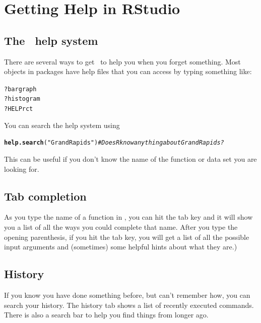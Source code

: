 \documentclass[twoside]{book}\usepackage[]{graphicx}\usepackage[]{xcolor}
\makeatletter
\newcommand{\hlstr}[1]{\textcolor[rgb]{0.192,0.494,0.8}{#1}}%
\newcommand{\hlcom}[1]{\textcolor[rgb]{0.678,0.584,0.686}{\textit{#1}}}%
\newcommand{\hlopt}[1]{\textcolor[rgb]{0,0,0}{#1}}%
\newcommand{\hlstd}[1]{\textcolor[rgb]{0.345,0.345,0.345}{#1}}%
\newcommand{\hlkwd}[1]{\textcolor[rgb]{0.737,0.353,0.396}{\textbf{#1}}}%
\newenvironment{kframe}{%
 \def\at@end@of@kframe{}%
 \ifinner\ifhmode%
  \def\at@end@of@kframe{\end{minipage}}%
  \begin{minipage}{\columnwidth}%
 \fi\fi%
 \def\FrameCommand##1{\hskip\@totalleftmargin \hskip-\fboxsep
 \colorbox{shadecolor}{##1}\hskip-\fboxsep
     \hskip-\linewidth \hskip-\@totalleftmargin \hskip\columnwidth}%
 \MakeFramed {\advance\hsize-\width
   \@totalleftmargin\z@ \linewidth\hsize
   \@setminipage}}%
 {\par\unskip\endMakeFramed%
 \at@end@of@kframe}
\newenvironment{knitrout}{}{} %
\makeatother
\begin{document}
\section{Getting Help in RStudio}

\subsection{The \RStudio\ help system}
There are several ways to get \RStudio\ to help you when you forget something.
Most objects in packages have help files that you can access by typing something 
like:
\begin{knitrout}
\color{fgcolor}\begin{kframe}
\begin{alltt}
\hlopt{?}\hlstd{bargraph}
\hlopt{?}\hlstd{histogram}
\hlopt{?}\hlstd{HELPrct}
\end{alltt}
\end{kframe}
\end{knitrout}
You can search the help system using
\begin{knitrout}
\color{fgcolor}\begin{kframe}
\begin{alltt}
\hlkwd{help.search}\hlstd{(}\hlstr{"Grand Rapids"}\hlstd{)}  \hlcom{# Does R know anything about Grand Rapids?}
\end{alltt}
\end{kframe}
\end{knitrout}
This can be useful if you don't know the name of the function or data set you 
are looking for.

\subsection{Tab completion}
As you type the name of a function in \RStudio, you can hit the tab key and it
will show you a list of all the ways you could complete that name. After
you type the opening parenthesis, if you hit the tab key, you will get a list
of all the possible input arguments and (sometimes) some helpful hints about what they are.)

\subsection{History}
If you know you have done something before, but can't remember how, you can
search your history.  The history tab shows a list of recently executed
commands.  There is also a search bar to help you find things from longer ago.
\end{document}
